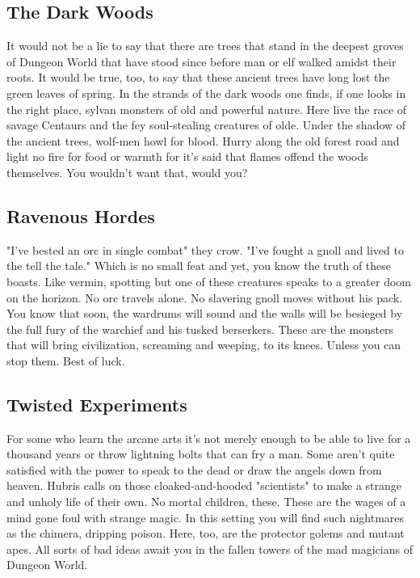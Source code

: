        
\subsection{The Dark Woods}    
       

It would not be a lie to say that there are trees that stand in the deepest groves of Dungeon World that have stood since before man or elf walked amidst their roots. It would be true, too, to say that these ancient trees have long lost the green leaves of spring. In the strands of the dark woods one finds, if one looks in the right place, sylvan monsters of old and powerful nature. Here live the race of savage Centaurs and the fey soul-stealing creatures of olde. Under the shadow of the ancient trees, wolf-men howl for blood. Hurry along the old forest road and light no fire for food or warmth for it's said that flames offend the woods themselves. You wouldn't want that, would you?

       
\subsection{Ravenous Hordes}    
       

"I've bested an orc in single combat" they crow. "I've fought a gnoll and lived to the tell the tale." Which is no small feat and yet, you know the truth of these boasts. Like vermin, spotting but one of these creatures speaks to a greater doom on the horizon. No orc travels alone. No slavering gnoll moves without his pack. You know that soon, the wardrums will sound and the walls will be besieged by the full fury of the warchief and his tusked berserkers. These are the monsters that will bring civilization, screaming and weeping, to its knees. Unless you can stop them. Best of luck.

       
\subsection{Twisted Experiments}    
       

For some who learn the arcane arts it's not merely enough to be able to live for a thousand years or throw lightning bolts that can fry a man. Some aren't quite satisfied with the power to speak to the dead or draw the angels down from heaven. Hubris calls on those cloaked-and-hooded "scientists" to make a strange and unholy life of their own. No mortal children, these. These are the wages of a mind gone foul with strange magic. In this setting you will find such nightmares as the chimera, dripping poison. Here, too, are the protector golems and mutant apes. All sorts of bad ideas await you in the fallen towers of the mad magicians of Dungeon World.

